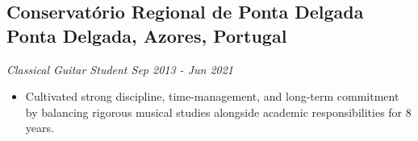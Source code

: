\documentclass[a4paper,10pt]{article}
\begin{document}
    \subsection*{\texorpdfstring{
            \textbf{Conservatório Regional de Ponta Delgada} \hfill Ponta Delgada, Azores, Portugal
        }{
            Conservatório Regional de Ponta Delgada -- Ponta Delgada, Azores, Portugal
        }}
    \textit{Classical Guitar Student \hfill Sep 2013 - Jun 2021}
        \begin{itemize}
            \item Cultivated strong discipline, time-management, and long-term commitment by balancing rigorous musical studies alongside academic responsibilities for 8 years.
        \end{itemize}
\end{document}
